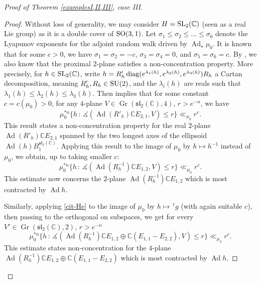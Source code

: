 \documentclass[11pt, leqno, fleqn]{amsart}
\def\SL{   {\rm SL}}
\def\SO{   {\rm SO}}
\def\SU{   {\rm SU}}
\DeclareMathOperator{\Gr}{Gr}
\newcommand{\C}{{\mathbb C}}
\theoremstyle{definition}
\theoremstyle{definition}
\DeclareMathOperator{\Ad}{Ad}
\newcommand{\diag}{\mathop{\rm diag}}
\begin{document}
\begin{proof}[Proof of Theorem \ref{examplesI,II,III}, case III]
		\begin{proof}
		Without loss of generality, we may consider  $H=\SL_{2}(\C)$ (seen as a real Lie group) as it is a double cover of $\SO(3,1)$. 
			Let  $\sigma_{1}\leq \sigma_{2}\leq \dots	\leq \sigma_{6}$ denote the Lyapunov exponents for the adjoint random walk driven by $\Ad_{\star}\mu_{0}$. It is known that for some $c>0$, we have $\sigma_{1}=\sigma_{2}=-c$, $\sigma_{3}=\sigma_{4}=0$, and $\sigma_{5}=\sigma_{6}=c$. By \cite[Proposition 1.2]{H4}, we also know that the proximal $2$-plane satisfies a non-concentration property. More precisely, for $h\in \SL_{2}(\C)$, write $h=R'_{h}\diag(e^{\lambda_{1}(h)}, e^{\lambda_{2}(h)}, e^{\lambda_{3}(h)})R_{h}$ a Cartan decomposition,  meaning $R'_{h},R_{h}\in \SU(2)$, and the $\lambda_{i}(h)$ are reals such that $\lambda_{1}(h)\leq \lambda_{2}(h)\leq \lambda_{3}(h)$. Then \cite[Proposition 1.2]{H4} implies that for some constant $c=c(\mu_{0})>0$, for any $4$-plane $V\in \Gr(\mathfrak{sl}_{2}(\C), 4)$, $r>e^{-n}$, we have
			\begin{equation}\label{cit-He}
				\mu_{0}^{*n} \{h\,:\, \measuredangle(\Ad(R'_{h})\C E_{2,1}, V)\leq r\}\ll_{\mu_{0}} r^c.
			\end{equation}
			This result states a non-concentration property for the real $2$-plane $\Ad(R'_{h})\C E_{2,1}$ spanned by the two longest axes of the ellipsoid $\Ad(h)B^{\mathfrak{sl}_{2}(\C) }_{1}$.
			Applying this result to the image of $\mu_{0}$ by $h\mapsto h^{-1}$ instead of $\mu_{0}$, we obtain, up to taking smaller $c$:
			\begin{equation}\label{nc-2plane}
				\mu_{0}^{*n} \{h\,:\, \measuredangle(\Ad(R^{-1}_{h})\C E_{1,2}, V)\leq r\}\ll_{\mu_{0}} r^c.
			\end{equation}
			This  estimate now concerns the $2$-plane $\Ad(R^{-1}_{h})\C E_{1,2}$ which is most contracted by $\Ad h$.  
			
			Similarly, applying \eqref{cit-He} to the image of $\mu_{0}$ by $h\mapsto \,^tg$ (with again suitable $c$), then  passing to the orthogonal on subspaces, we get for every $V'\in \Gr(\mathfrak{sl}_{2}(\C), 2)$, $r>e^{-n}$
			\begin{equation}\label{nc-4plane}
				\mu_{0}^{*n} \{h\,:\, \measuredangle(\Ad(R^{-1}_{h}) \C E_{1,2}\oplus \C (E_{1,1}-E_{2,2}), V)\leq r\}\ll_{\mu_{0}} r^c.
			\end{equation}
			This  estimate states non-concentration for the $4$-plane $\Ad(R^{-1}_{h}) \C E_{1,2}\oplus \C (E_{1,1}-E_{2,2})$ which is most contracted by $\Ad h$.  
			

\end{proof}
\end{proof}
\end{document}
